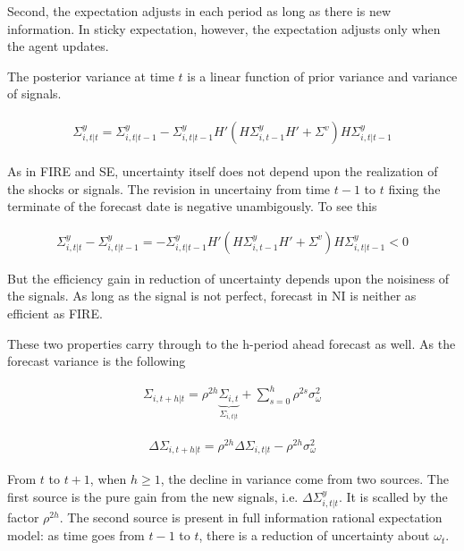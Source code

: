 \documentclass[]{article}
\begin{document}
Second, the expectation adjusts in each period as long as there is new information. In sticky expectation, however, the expectation adjusts only when the agent updates. 


The posterior variance at time $t$ is a linear function of prior variance and variance of signals. 

\begin{eqnarray}\label{VarNIRv}
\begin{aligned}
\Sigma^y_{i,t|t} = \Sigma^y_{i,t|t-1} - \Sigma^y_{i,t|t-1} H'(H \Sigma^y_{i,t-1} H' +\Sigma^v) H \Sigma^y_{i,t|t-1} 
\end{aligned}
\end{eqnarray}


As in FIRE and SE, uncertainty itself does not depend upon the realization of the shocks or signals. The revision in uncertainy from time $t-1$ to $t$ fixing the terminate of the forecast date is negative  unambigously. To see this 

\begin{eqnarray}
\Sigma^y_{i,t|t} - \Sigma^y_{i,t|t-1} = - \Sigma^y_{i,t|t-1} H'(H \Sigma^y_{i,t-1} H' +\Sigma^v) H \Sigma^y_{i,t|t-1} <0
\end{eqnarray}

But the efficiency gain in reduction of uncertainty depends upon the noisiness of the signals. As long as the signal is not perfect, forecast in NI is neither as efficient as FIRE. 

These two properties carry through to the h-period ahead forecast as well. As the forecast variance is the following 

\begin{eqnarray}\label{VarNIEq}
\Sigma_{i,t+h|t} = \rho^{2h} \underbrace{\Sigma_{i,t}}_{\Sigma_{i,t|t}} + \sum^{h}_{s=0}\rho^{2s} \sigma^2_{\omega}
\end{eqnarray}


\begin{eqnarray}\label{VarNIIndPop}
\Delta \Sigma_{i,t+h|t} = \rho^{2h}\Delta  \Sigma_{i,t|t}  - \rho^{2h} \sigma^2_{\omega}
\end{eqnarray}

From $t$ to $t+1$, when $h\geq 1$, the decline in variance come from two sources. The first source is the pure gain from the new signals, i.e. $\Delta \Sigma^y_{i,t|t}$. It is scalled by the factor $\rho^{2h}$. The second source is present in full information rational expectation model: as time goes from $t-1$ to $t$, there is a reduction of uncertainty about $\omega_t$.
\end{document}
